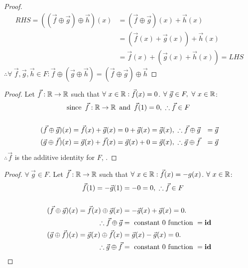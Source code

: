 \begin{enumerate}
\begin{proof}
\begin{align*}
      RHS = ((\vec{f} \oplus \vec{g}) \oplus \vec{h})(x) & = (\vec{f} \oplus \vec{g})(x) + \vec{h}(x)     \\
                                                         & = (\vec{f}(x) + \vec{g}(x)) + \vec{h}(x)       \\
                                                         & = \vec{f}(x) + (\vec{g}(x) + \vec{h}(x)) = LHS
    \end{align*}
    $\therefore \forall~\vec{f},\vec{g},\vec{h} \in F: \vec{f} \oplus (\vec{g} \oplus \vec{h}) = (\vec{f} \oplus \vec{g}) \oplus \vec{h}$
  \end{proof}
  \begin{proof}
    Let $\vec{f}: \mathbb{R} \rightarrow \mathbb{R}$ such that $\forall~x \in \mathbb{R}: \vec{f}(x) = 0$. $\forall~\vec{g} \in F,~\forall~x \in \mathbb{R}$:
    \begin{align*}
      \operatorname{~\text{since}~} \vec{f}: \mathbb{R} \rightarrow \mathbb{R}            & \operatorname{~\text{and}~} \vec{f}(1) = 0,~\therefore \vec{f} \in F                              \\ \\
      (\vec{f} \oplus \vec{g})(x) = \vec{f}(x) + \vec{g}(x) & = 0 + \vec{g}(x)= \vec{g}(x),~\therefore \vec{f} \oplus \vec{g} & = \vec{g} \\
      (\vec{g} \oplus \vec{f})(x) = \vec{g}(x) + \vec{f}(x) & = \vec{g}(x) + 0= \vec{g}(x),~\therefore \vec{g} \oplus \vec{f} & = \vec{g}
    \end{align*}
    $\therefore \vec{f}$ is the additive identity for $F$, .
  \end{proof}
  \begin{proof}
    $\forall~\vec{g} \in F$. Let $\vec{f}: \mathbb{R} \rightarrow \mathbb{R}$ such that $\forall~x \in \mathbb{R}: \vec{f}(x) = -g(x)$. $\forall~x \in \mathbb{R}$:
    \begin{align*}
      \vec{f}(1) = -\vec{g}(1)                                   & = -0 = 0,~\therefore \vec{f} \in F        \\ \\
      (\vec{f} \oplus \vec{g})(x) = \vec{f}(x) \oplus \vec{g}(x) & = -\vec{g}(x) + \vec{g}(x)= 0.            \\
      \therefore \vec{f} \oplus \vec{g}                          & = ~\text{constant 0 function}~ = \bld{id} \\
      (\vec{g} \oplus \vec{f})(x) = \vec{g}(x) \oplus \vec{f}(x) & = \vec{g}(x) - \vec{g}(x)= 0.             \\
      \therefore \vec{g} \oplus \vec{f}                          & = ~\text{constant 0 function}~ = \bld{id}

\end{align*}
\end{proof}
\end{enumerate}
